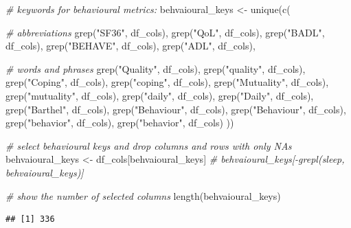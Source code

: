 \documentclass[
]{article}
\newenvironment{Shaded}{\begin{snugshade}}{\end{snugshade}}
\newcommand{\CommentTok}[1]{\textcolor[rgb]{0.56,0.35,0.01}{\textit{#1}}}
\newcommand{\FunctionTok}[1]{\textcolor[rgb]{0.00,0.00,0.00}{#1}}
\newcommand{\NormalTok}[1]{#1}
\newcommand{\OtherTok}[1]{\textcolor[rgb]{0.56,0.35,0.01}{#1}}
\newcommand{\StringTok}[1]{\textcolor[rgb]{0.31,0.60,0.02}{#1}}
\begin{document}
\begin{Shaded}
\begin{Highlighting}[]
\CommentTok{\# keywords for behavioural metrics:}
\NormalTok{behvaioural\_keys }\OtherTok{\textless{}{-}} \FunctionTok{unique}\NormalTok{(}\FunctionTok{c}\NormalTok{(}

    \CommentTok{\# abbreviations}
    \FunctionTok{grep}\NormalTok{(}\StringTok{"SF36"}\NormalTok{, df\_cols),}
    \FunctionTok{grep}\NormalTok{(}\StringTok{"QoL"}\NormalTok{, df\_cols),}
    \FunctionTok{grep}\NormalTok{(}\StringTok{"BADL"}\NormalTok{, df\_cols),}
    \FunctionTok{grep}\NormalTok{(}\StringTok{"BEHAVE"}\NormalTok{, df\_cols),}
    \FunctionTok{grep}\NormalTok{(}\StringTok{"ADL"}\NormalTok{, df\_cols),}

    \CommentTok{\# words and phrases}
    \FunctionTok{grep}\NormalTok{(}\StringTok{"Quality"}\NormalTok{, df\_cols),}
    \FunctionTok{grep}\NormalTok{(}\StringTok{"quality"}\NormalTok{, df\_cols), }
    \FunctionTok{grep}\NormalTok{(}\StringTok{"Coping"}\NormalTok{, df\_cols),}
    \FunctionTok{grep}\NormalTok{(}\StringTok{"coping"}\NormalTok{, df\_cols),}
    \FunctionTok{grep}\NormalTok{(}\StringTok{"Mutuality"}\NormalTok{, df\_cols),}
    \FunctionTok{grep}\NormalTok{(}\StringTok{"mutuality"}\NormalTok{, df\_cols),}
    \FunctionTok{grep}\NormalTok{(}\StringTok{"daily"}\NormalTok{, df\_cols),}
    \FunctionTok{grep}\NormalTok{(}\StringTok{"Daily"}\NormalTok{, df\_cols),}
    \FunctionTok{grep}\NormalTok{(}\StringTok{"Barthel"}\NormalTok{, df\_cols),}
    \FunctionTok{grep}\NormalTok{(}\StringTok{"Behaviour"}\NormalTok{, df\_cols),}
    \FunctionTok{grep}\NormalTok{(}\StringTok{"Behaviour"}\NormalTok{, df\_cols),}
    \FunctionTok{grep}\NormalTok{(}\StringTok{"behavior"}\NormalTok{, df\_cols),}
    \FunctionTok{grep}\NormalTok{(}\StringTok{"behavior"}\NormalTok{, df\_cols)}
\NormalTok{    ))}

\CommentTok{\# select behavioural keys and drop columns and rows with only NAs}
\NormalTok{behvaioural\_keys }\OtherTok{\textless{}{-}}\NormalTok{ df\_cols[behvaioural\_keys]}
\CommentTok{\# behvaioural\_keys[{-}grepl(\textquotesingle{}sleep\textquotesingle{}, behvaioural\_keys)]}

\CommentTok{\# show the number of selected columns}
\FunctionTok{length}\NormalTok{(behvaioural\_keys)}
\end{Highlighting}
\end{Shaded}

\begin{verbatim}
## [1] 336
\end{verbatim}
\end{document}
